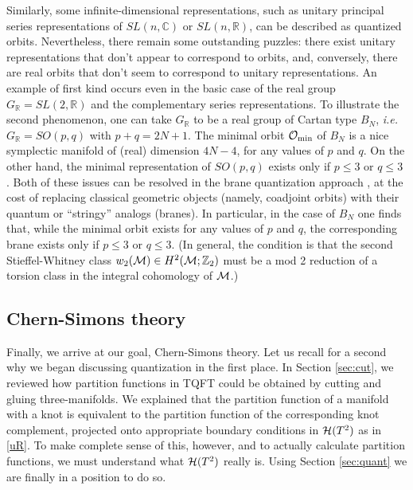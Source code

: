 \documentclass[letterpaper,12pt]{article}
\numberwithin{equation}{section}
\newcommand{\R}{{\mathbb{R}}}
\newcommand{\C}{{\mathbb{C}}}
\newcommand{\Z}{{\mathbb{Z}}}
\newcommand{\CH}{{\cal H}}
\newcommand{\CM}{{\cal M}}
\newcommand{\CO}{{\cal O}}
\renewcommand{\=}{\;=\;}
\begin{document}
Similarly, some infinite-dimensional representations,
such as unitary principal series representations of $SL(n,\C)$ or $SL(n,\R)$, can be described as quantized orbits.
Nevertheless, there remain some outstanding puzzles:
there exist unitary representations that don't appear to correspond to orbits, and, conversely, there are real orbits that don't seem to correspond to unitary representations.
An example of first kind occurs even in the basic case
of the real group $G_{\R} = SL(2,\R)$ and the complementary series representations.
To illustrate the second phenomenon, one can take $G_{\R}$ to be
a real group of Cartan type $B_N$, {\it i.e.} $G_{\R} = SO(p,q)$ with $p+q=2N+1$.
The minimal orbit $\CO_{{\rm min}}$ of $B_N$ is a nice symplectic manifold
of (real) dimension $4N-4$, for any values of $p$ and $q$.
On the other hand, the minimal representation of $SO(p,q)$
exists only if $p \le 3$ or $q \le 3$ \cite{vogan-singular-unitary}.
Both of these issues can be resolved in the brane quantization approach \cite{gukov-2008},
at the cost of replacing classical geometric objects (namely, coadjoint orbits)
with their quantum or ``stringy'' analogs (branes).
In particular, in the case of $B_N$ one finds that,
while the minimal orbit exists for any values of $p$ and $q$,
the corresponding brane exists only if $p \le 3$ or $q \le 3$.
(In general, the condition is that the second Stieffel-Whitney class
$w_2(\CM) \in H^2(\CM;\Z_2)$ must be
a mod 2 reduction of a torsion class in the integral cohomology of $\CM$.)



\subsection{Chern-Simons theory}



Finally, we arrive at our goal, Chern-Simons theory. Let us recall for a second why we began discussing quantization in the first place. In Section \ref{sec:cut}, we reviewed how partition functions in TQFT could be obtained by cutting and gluing three-manifolds. We explained that the partition function of a manifold with a knot is equivalent to the partition function of the corresponding knot complement, projected onto appropriate boundary conditions in $\CH(T^2)$ as in \eqref{uR}. To make complete sense of this, however, and to actually calculate partition functions, we must understand what $\CH(T^2)$ really is. Using Section \ref{sec:quant} we are finally in a position to do so.
\end{document}
